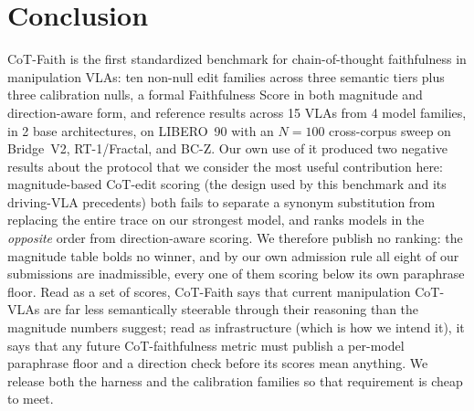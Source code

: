 \documentclass{article}
\begin{document}
\section{Conclusion}
CoT-Faith is the first standardized benchmark for chain-of-thought faithfulness in manipulation VLAs: ten non-null edit families across three semantic tiers plus three calibration nulls, a formal Faithfulness Score in both magnitude and direction-aware form, and reference results across 15 VLAs from 4 model families, in 2 base architectures, on LIBERO~90 with an $N{=}100$ cross-corpus sweep on Bridge~V2, RT-1/Fractal, and BC-Z. Our own use of it produced two negative results about the protocol that we consider the most useful contribution here: magnitude-based CoT-edit scoring (the design used by this benchmark and its driving-VLA precedents) both fails to separate a synonym substitution from replacing the entire trace on our strongest model, and ranks models in the \emph{opposite} order from direction-aware scoring. We therefore publish no ranking: the magnitude table bolds no winner, and by our own admission rule all eight of our submissions are inadmissible, every one of them scoring below its own paraphrase floor. Read as a set of scores, CoT-Faith says that current manipulation CoT-VLAs are far less semantically steerable through their reasoning than the magnitude numbers suggest; read as infrastructure (which is how we intend it), it says that any future CoT-faithfulness metric must publish a per-model paraphrase floor and a direction check before its scores mean anything. We release both the harness and the calibration families so that requirement is cheap to meet.
\end{document}
